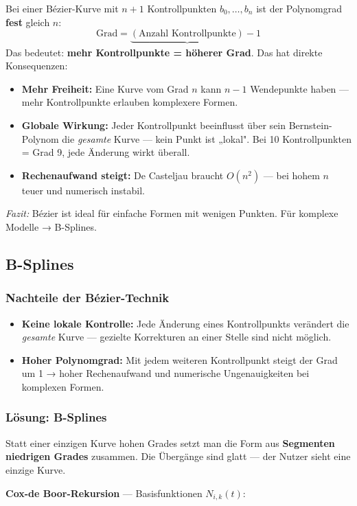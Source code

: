 \documentclass[12pt, a4paper]{article}
\begin{document}
Bei einer Bézier-Kurve mit $n+1$ Kontrollpunkten $b_0, \dots, b_n$ ist der Polynomgrad \textbf{fest} gleich $n$:
\[
  \text{Grad} = \underbrace{(\text{Anzahl Kontrollpunkte})}_{ } - 1
\]
Das bedeutet: \textbf{mehr Kontrollpunkte = höherer Grad}. Das hat direkte Konsequenzen:
\begin{itemize}
  \item \textbf{Mehr Freiheit:} Eine Kurve vom Grad $n$ kann $n-1$ Wendepunkte haben — mehr Kontrollpunkte erlauben komplexere Formen.
  \item \textbf{Globale Wirkung:} Jeder Kontrollpunkt beeinflusst über sein Bernstein-Polynom die \textit{gesamte} Kurve — kein Punkt ist „lokal". Bei 10 Kontrollpunkten = Grad 9, jede Änderung wirkt überall.
  \item \textbf{Rechenaufwand steigt:} De Casteljau braucht $O(n^2)$ — bei hohem $n$ teuer und numerisch instabil.
\end{itemize}
\textit{Fazit:} Bézier ist ideal für einfache Formen mit wenigen Punkten. Für komplexe Modelle → B-Splines.

\subsection{B-Splines}

\subsubsection*{Nachteile der Bézier-Technik}
\begin{itemize}
  \item \textbf{Keine lokale Kontrolle:} Jede Änderung eines Kontrollpunkts verändert die \textit{gesamte} Kurve — gezielte Korrekturen an einer Stelle sind nicht möglich.
  \item \textbf{Hoher Polynomgrad:} Mit jedem weiteren Kontrollpunkt steigt der Grad um 1 → hoher Rechenaufwand und numerische Ungenauigkeiten bei komplexen Formen.
\end{itemize}

\subsubsection*{Lösung: B-Splines}

Statt einer einzigen Kurve hohen Grades setzt man die Form aus \textbf{Segmenten niedrigen Grades} zusammen. Die Übergänge sind glatt — der Nutzer sieht eine einzige Kurve.

\textbf{Cox-de Boor-Rekursion} — Basisfunktionen $N_{i,k}(t)$:
\end{document}
